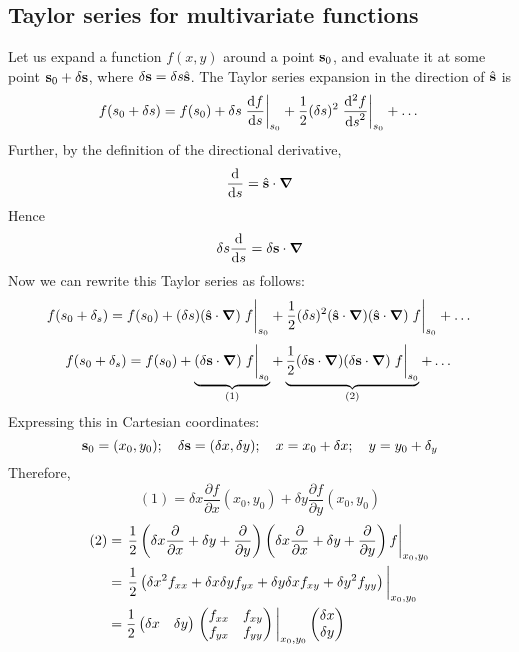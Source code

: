 \subsection{Taylor series for multivariate functions}
Let us expand a function \(f(x, y)\) around a point \(\vb s_0\), and evaluate it at some point \(\vb s_0 + \delta \vb s\), where \(\delta \vb s = \delta s \hat{\vb s}\).
The Taylor series expansion in the direction of \(\hat{\vb s}\) is
\[
	f(s_0 + \delta s) = f(s_0) + \delta s \eval{\frac{\dd{f}}{\dd{s}} }_{s_0} + \frac{1}{2} (\delta s)^2\eval{\frac{\dd^2 f}{\dd{s}^2}}_{s_0} + \dots
\]
Further, by the definition of the directional derivative,
\[
	\frac{\dd}{\dd{s}} = \hat{\vb s}\cdot \grad
\]
Hence
\[
	\delta s \frac{\dd}{\dd{s}} = \delta \vb s \cdot \grad
\]
Now we can rewrite this Taylor series as follows:
\[
	f(s_0 + \delta_s) = f(s_0) + (\delta s)(\hat{\vb s} \cdot \grad) \eval{f}_{s_0} + \frac{1}{2}(\delta s)^2(\hat{\vb s} \cdot \grad)(\hat{\vb s} \cdot \grad)\eval{f}_{s_0} + \dots
\]
\[
	f(s_0 + \delta_s) = f(s_0) + \underbrace{(\delta \vb s \cdot \grad) \eval{f}_{s_0}}_{(1)} + \underbrace{\frac{1}{2}(\delta \vb s \cdot \grad)(\delta \vb s \cdot \grad)\eval{f}_{s_0}}_{(2)} + \dots
\]
Expressing this in Cartesian coordinates:
\[
	\vb s_0 = (x_0, y_0);\quad \delta \vb s = (\delta x, \delta y);\quad x=x_0+\delta x;\quad y=y_0+\delta_y
\]
Therefore,
\[
	(1) = \delta x \frac{\partial f}{\partial x}(x_0, y_0) + \delta y \frac{\partial f}{\partial y}(x_0, y_0)
\]
\begin{align*}
	(2) & = \eval{\frac{1}{2}\left( \delta x \frac{\partial}{\partial x} + \delta y + \frac{\partial}{\partial y} \right)\left( \delta x \frac{\partial}{\partial x} + \delta y + \frac{\partial}{\partial y} \right)f}_{x_0, y_0} \\
	    & = \eval{\frac{1}{2}\left( \delta x^2 f_{xx} + \delta x \delta y f_{yx} + \delta y \delta x f_{xy} + \delta y^2 f_{yy} \right)}_{x_0, y_0}                                                                                \\
	    & = \frac{1}{2}\begin{pmatrix}
		                   \delta x & \delta y
	                   \end{pmatrix} \eval{\begin{pmatrix}
			                                       f_{xx} & f_{xy} \\
			                                       f_{yx} & f_{yy}
		                                       \end{pmatrix}}_{x_0, y_0} \begin{pmatrix}
		                                                                 \delta x \\ \delta y
	                                                                 \end{pmatrix}
\end{align*}

